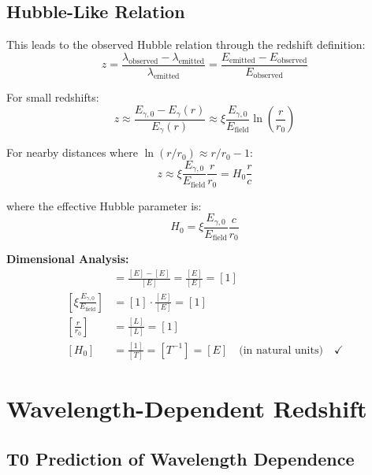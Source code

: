 \documentclass[12pt,a4paper]{report}
\begin{document}
	\subsection{Hubble-Like Relation}
	\label{subsec:hubble_like_relation}
	
	This leads to the observed Hubble relation through the redshift definition:
	\begin{equation}
		z = \frac{\lambda_{\text{observed}} - \lambda_{\text{emitted}}}{\lambda_{\text{emitted}}} = \frac{E_{\text{emitted}} - E_{\text{observed}}}{E_{\text{observed}}}
	\end{equation}
	
	For small redshifts:
	\begin{equation}
		z \approx \frac{E_{\gamma,0} - E_\gamma(r)}{E_\gamma(r)} \approx \xi \frac{E_{\gamma,0}}{E_{\text{field}}} \ln\left(\frac{r}{r_0}\right)
	\end{equation}
	
	For nearby distances where $\ln(r/r_0) \approx r/r_0 - 1$:
	\begin{equation}
		z \approx \xi \frac{E_{\gamma,0}}{E_{\text{field}}} \frac{r}{r_0} = H_0 \frac{r}{c}
	\end{equation}
	
	where the effective Hubble parameter is:
	\begin{equation}
		H_0 = \xi \frac{E_{\gamma,0}}{E_{\text{field}}} \frac{c}{r_0}
	\end{equation}
	
	\textbf{Dimensional Analysis:}
	\begin{align}
		[z] &= \frac{[E] - [E]}{[E]} = \frac{[E]}{[E]} = [1] \\
		\left[\xi \frac{E_{\gamma,0}}{E_{\text{field}}}\right] &= [1] \cdot \frac{[E]}{[E]} = [1] \\
		\left[\frac{r}{r_0}\right] &= \frac{[L]}{[L]} = [1] \\
		[H_0] &= \frac{[1]}{[T]} = [T^{-1}] = [E] \quad \text{(in natural units)} \quad \checkmark
	\end{align}
	
	\section{Wavelength-Dependent Redshift}
	\label{sec:wavelength_dependent_redshift}
	
	\subsection{T0 Prediction of Wavelength Dependence}
	\label{subsec:t0_wavelength_dependence}
	
\end{document}
